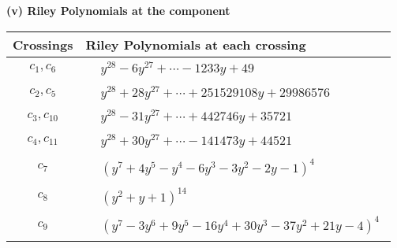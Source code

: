 \documentclass[1p]{elsarticle_modified}
\theoremstyle{definition}
\begin{document}
\flushleft \textbf{(v) Riley Polynomials at the component}\newline \\
\begin{tabular}{m{50pt}|m{274pt}}
Crossings & \hspace{64pt}Riley Polynomials at each crossing \\
\hline $$\begin{aligned}c_{1},c_{6}\end{aligned}$$&$\begin{aligned}
&y^{28}-6 y^{27}+\cdots-1233 y+49
\end{aligned}$\\
\hline $$\begin{aligned}c_{2},c_{5}\end{aligned}$$&$\begin{aligned}
&y^{28}+28 y^{27}+\cdots+251529108 y+29986576
\end{aligned}$\\
\hline $$\begin{aligned}c_{3},c_{10}\end{aligned}$$&$\begin{aligned}
&y^{28}-31 y^{27}+\cdots+442746 y+35721
\end{aligned}$\\
\hline $$\begin{aligned}c_{4},c_{11}\end{aligned}$$&$\begin{aligned}
&y^{28}+30 y^{27}+\cdots-141473 y+44521
\end{aligned}$\\
\hline $$\begin{aligned}c_{7}\end{aligned}$$&$\begin{aligned}
&(y^7+4 y^5- y^4-6 y^3-3 y^2-2 y-1)^4
\end{aligned}$\\
\hline $$\begin{aligned}c_{8}\end{aligned}$$&$\begin{aligned}
&(y^2+y+1)^{14}
\end{aligned}$\\
\hline $$\begin{aligned}c_{9}\end{aligned}$$&$\begin{aligned}
&(y^7-3 y^6+9 y^5-16 y^4+30 y^3-37 y^2+21 y-4)^4
\end{aligned}$\\
\hline
\end{tabular}\\~\\
\end{document}
